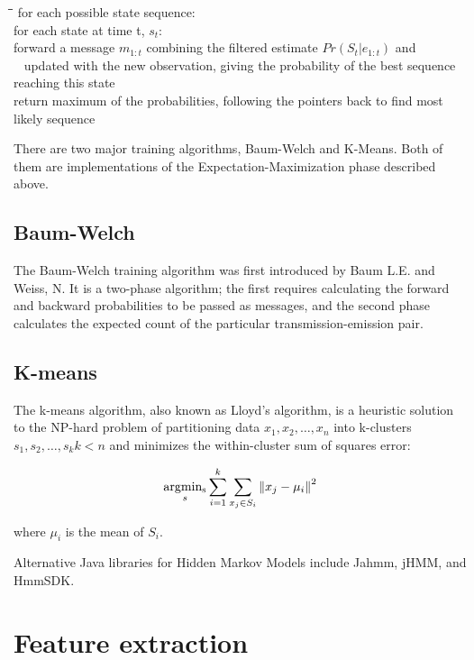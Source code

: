 \documentclass[12pt,a4,notitlepage]{report}
\renewcommand{\_}{\texttt{\symbol{95}}}
\newcommand{\<}{\texttt{\symbol{60}}}
\renewcommand{\>}{\texttt{\symbol{62}}}
\newenvironment{pseudocode}{\begin{slshape}\begin{tabbing}\hspace*{0.5cm}\=\hspace*{0.5cm}\=\hspace*{0.5cm}\= \kill }{\end{tabbing}\end{slshape}}
\begin{document}
\begin{pseudocode}
for each possible state sequence: \\
\>  for each state at time t, $s_t$: \\
\>\>    forward a message $m_{1:t}$ combining the filtered estimate $Pr(S_t|e_{1:t})$ and \\\ \>\> updated with the new observation, giving the probability of the best sequence reaching this state \\
\> return maximum of the probabilities, following the pointers back to find most likely sequence \\
\end{pseudocode}

There are two major training algorithms, Baum-Welch\cite{Baum-Welch} and K-Means\cite{K-Means}. Both of 
them are implementations of the Expectation-Maximization phase described above.

\subsection{Baum-Welch}

The Baum-Welch training algorithm was first introduced by Baum L.E. and Weiss, N\cite{Baum-Welch}. It is a two-phase algorithm; the first requires calculating the forward and backward probabilities to be passed as messages, and the second phase calculates the expected count of the particular transmission-emission pair.

\subsection{K-means}

The k-means algorithm, also known as Lloyd's algorithm, is a heuristic solution to the NP-hard problem of partitioning data $x_1, x_2, \ldots, x_n$ into k-clusters $s_1, s_2, \ldots, s_k k < n$ and minimizes the within-cluster sum of squares error:

\[
{\underset{s}{\operatornamewithlimits{argmin_s}}\sum_{i=1}^k \sum_{x_j \in S_i} {\|x_j-\mu_i\|}^2}
\]

where $\mu_i$ is the mean of $S_i$.

Alternative Java libraries for Hidden Markov Models include Jahmm, jHMM, and HmmSDK.

\section{Feature extraction}
\end{document}
